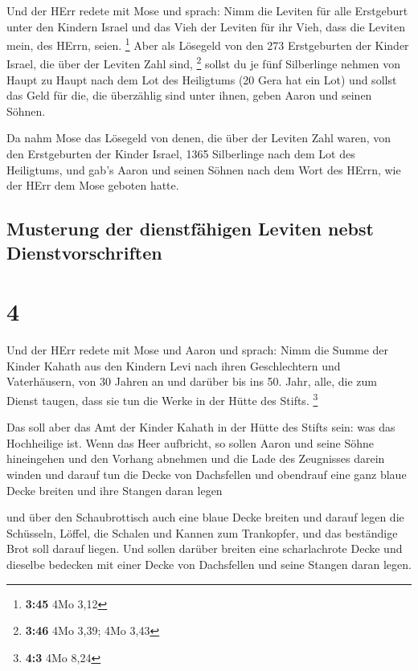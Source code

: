  Und der HErr redete mit Mose und sprach: 
Nimm die Leviten für alle Erstgeburt unter den Kindern Israel und das
Vieh der Leviten für ihr Vieh, dass die Leviten mein, des HErrn, seien.
\footnote{\textbf{3:45} 4Mo 3,12}  Aber als Lösegeld von
den 273 Erstgeburten der Kinder Israel, die über der Leviten Zahl sind,
\footnote{\textbf{3:46} 4Mo 3,39; 4Mo 3,43}  sollst du je
fünf Silberlinge nehmen von Haupt zu Haupt nach dem Lot des Heiligtums
(20 Gera hat ein Lot)  und sollst das Geld für die, die
überzählig sind unter ihnen, geben Aaron und seinen Söhnen.

 Da nahm Mose das Lösegeld von denen, die über der
Leviten Zahl waren,  von den Erstgeburten der Kinder
Israel, 1365 Silberlinge nach dem Lot des Heiligtums, 
und gab's Aaron und seinen Söhnen nach dem Wort des HErrn, wie der HErr
dem Mose geboten hatte.

\hypertarget{musterung-der-dienstfuxe4higen-leviten-nebst-dienstvorschriften}{%
\subsection{Musterung der dienstfähigen Leviten nebst
Dienstvorschriften}\label{musterung-der-dienstfuxe4higen-leviten-nebst-dienstvorschriften}}

\hypertarget{section-3}{%
\section{4}\label{section-3}}

 Und der HErr redete mit Mose und Aaron und sprach:
 Nimm die Summe der Kinder Kahath aus den Kindern Levi
nach ihren Geschlechtern und Vaterhäusern,  von 30 Jahren
an und darüber bis ins 50. Jahr, alle, die zum Dienst taugen, dass sie
tun die Werke in der Hütte des Stifts. \footnote{\textbf{4:3} 4Mo 8,24}

 Das soll aber das Amt der Kinder Kahath in der Hütte des
Stifts sein: was das Hochheilige ist.  Wenn das Heer
aufbricht, so sollen Aaron und seine Söhne hineingehen und den Vorhang
abnehmen und die Lade des Zeugnisses darein winden  und
darauf tun die Decke von Dachsfellen und obendrauf eine ganz blaue Decke
breiten und ihre Stangen daran legen

 und über den Schaubrottisch auch eine blaue Decke breiten
und darauf legen die Schüsseln, Löffel, die Schalen und Kannen zum
Trankopfer, und das beständige Brot soll darauf liegen. 
Und sollen darüber breiten eine scharlachrote Decke und dieselbe
bedecken mit einer Decke von Dachsfellen und seine Stangen daran legen.

